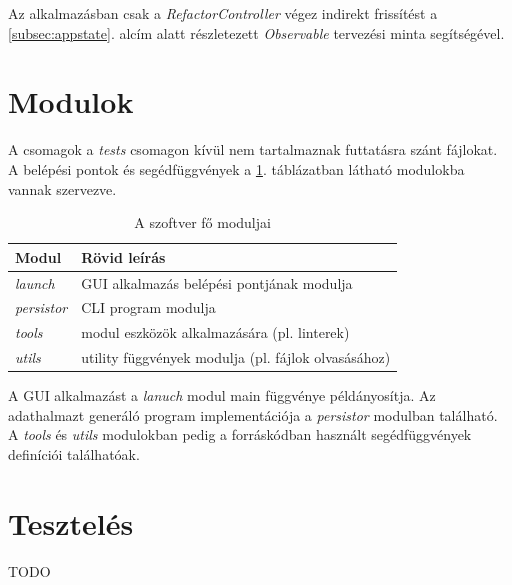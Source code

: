 Az alkalmazásban csak a \emph{RefactorController} végez indirekt frissítést a
\ref{subsec:appstate}. alcím alatt részletezett \emph{Observable} tervezési minta
segítségével. 

\section{Modulok}
\label{sec:modules}

A csomagok a \emph{tests} csomagon kívül nem tartalmaznak futtatásra szánt fájlokat.
A belépési pontok és segédfüggvények a \ref{tab:modules}. táblázatban
látható modulokba vannak szervezve.

\begin{table}[H]
	\centering
	\begin{tabular}{ | m{} | m{} | }
		\hline
		\textbf{Modul} & \textbf{Rövid leírás} \\
		\hline \hline
		\emph{launch} & GUI alkalmazás belépési pontjának modulja \\
		\hline
		\emph{persistor} & CLI program modulja \\
		\hline
		\emph{tools} & modul eszközök alkalmazására (pl. linterek) \\
		\hline
		\emph{utils} & utility függvények modulja (pl. fájlok olvasásához)  \\
		\hline
	\end{tabular}
	\caption{A szoftver fő moduljai}
	\label{tab:modules}
\end{table}

A GUI alkalmazást a \emph{lanuch} modul main függvénye példányosítja.
Az adathalmazt generáló program implementációja a \emph{persistor} modulban található.
A \emph{tools} és \emph{utils} modulokban pedig a forráskódban használt
segédfüggvények definíciói találhatóak.

\pagebreak

\section{Tesztelés}

TODO

\pagebreak
